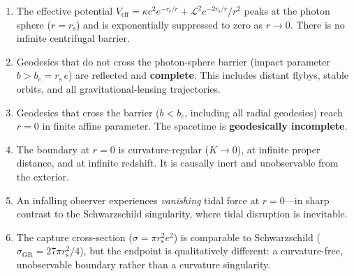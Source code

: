 \documentclass[11pt]{article}
\newcommand{\rs}{r_{\mathrm{s}}}
\begin{document}
\begin{enumerate}
\item The effective potential
  $V_{\mathrm{eff}} = \kappa c^{2}e^{-\rs/r}
  + \mathcal{L}^{2}e^{-2\rs/r}/r^{2}$
  peaks at the photon sphere ($r = \rs$)
  and is exponentially suppressed to zero as
  $r \to 0$.  There is no infinite centrifugal
  barrier.

\item Geodesics that do not cross the photon-sphere
  barrier (impact parameter $b > b_{c} = \rs\,e$)
  are reflected and \textbf{complete}.  This includes
  distant flybys, stable orbits, and all
  gravitational-lensing trajectories.

\item Geodesics that cross the barrier
  ($b < b_{c}$, including all radial geodesics)
  reach $r = 0$ in finite affine parameter.
  The spacetime is \textbf{geodesically incomplete}.

\item The boundary at $r = 0$ is curvature-regular
  ($K \to 0$), at infinite proper distance, and
  at infinite redshift.  It is causally inert and
  unobservable from the exterior.

\item An infalling observer experiences
  \emph{vanishing} tidal force at $r = 0$---in sharp
  contrast to the Schwarzschild singularity, where
  tidal disruption is inevitable.

\item The capture cross-section
  ($\sigma = \pi\rs^{2}e^{2}$) is comparable to
  Schwarzschild
  ($\sigma_{\mathrm{GR}} = 27\pi\rs^{2}/4$),
  but the endpoint is qualitatively different:
  a curvature-free, unobservable boundary
  rather than a curvature singularity.
\end{enumerate}
\end{document}
